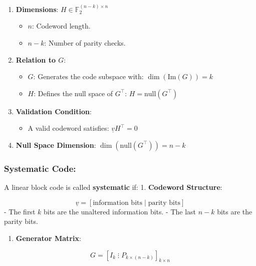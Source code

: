 \documentclass[11pt]{article}
\providecommand{\tightlist}{%
      \setlength{\itemsep}{0pt}\setlength{\parskip}{0pt}}
\begin{document}
\begin{enumerate}
\def\labelenumi{\arabic{enumi}.}
\tightlist
\item
  \textbf{Dimensions}: \(H \in \mathbb{F}_2^{(n-k) \times n}\)

  \begin{itemize}
  \tightlist
  \item
    \(n\): Codeword length.
  \item
    \(n-k\): Number of parity checks.
  \end{itemize}
\item
  \textbf{Relation to \(G\)}:

  \begin{itemize}
  \tightlist
  \item
    \(G\): Generates the code subspace with: \(\dim(\text{Im}(G)) = k\)
  \item
    \(H\): Defines the null space of \(G^\top\):
    \(H = \text{null}(G^\top)\)
  \end{itemize}
\item
  \textbf{Validation Condition}:

  \begin{itemize}
  \tightlist
  \item
    A valid codeword satisfies: \(\underline{v} H^\top = 0\)
  \end{itemize}
\item
  \textbf{Null Space Dimension}: \(\dim(\text{null}(G^\top)) = n - k\)
\end{enumerate}

    \subsubsection{Systematic Code:}\label{systematic-code}

A linear block code is called \textbf{systematic} if: 1.
\textbf{Codeword Structure}:

\[\boxed{\underline{v} = [\text{information bits} \; | \; \text{parity bits}]}\]
- The first \(k\) bits are the unaltered information bits. - The last
\(n-k\) bits are the parity bits.

\begin{enumerate}
\def\labelenumi{\arabic{enumi}.}
\setcounter{enumi}{1}
\tightlist
\item
  \textbf{Generator Matrix}:
\end{enumerate}

\[\boxed{G = [I_k \; \vdots \; P_{k \times (n-k)}]_{k \times n}}\]
\end{document}
